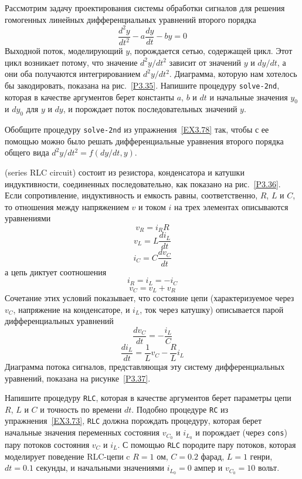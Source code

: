 \begin{exercise}{3.78}\label{EX3.78}%
Рассмотрим задачу проектирования системы обработки
сигналов для решения гомогенных линейных дифференциальных уравнений
второго порядка
$$
\frac{d^2 y}{dt^2} - a \frac{dy}{dt} - by = 0
$$
Выходной поток, моделирующий $y$, порождается сетью,
содержащей цикл.  Этот цикл возникает потому, что
значение ${d^2 y}/{dt^2}$ зависит от значений
$y$ и $dy/dt$, а они оба получаются
интегрированием ${d^2 y}/{dt^2}$.  Диаграмма, которую
нам хотелось бы закодировать, показана на
рис.~\ref{P3.35}.  Напишите процедуру
{\tt solve-2nd}, которая в качестве аргументов берет константы
$a$, $b$ и $dt$ и начальные значения
$y_0$ и $dy_0$ для $y$ и
$dy$, и порождает поток последовательных значений
$y$.
\end{exercise}
\begin{exercise}{3.79}\label{EX3.79}%
Обобщите процедуру {\tt solve-2nd} из
упражнения~\ref{EX3.78} так, чтобы с ее помощью можно было решать
дифференциальные уравнения второго порядка общего вида
${d^2 y}/{dt^2} = f (dy/dt, y)$.
\end{exercise}
\begin{exercise}{3.80}\label{EX3.80}%
 (series RLC circuit)
состоит из резистора, конденсатора и катушки
индуктивности, соединенных последовательно, как показано на
рис.~\ref{P3.36}. Если сопротивление, индуктивность и
емкость равны, соответственно, $R$, $L$ и
$C$, то отношения между напряжением $v$ и током
$i$ на трех элементах описываются уравнениями
$$
v_R = i_R R
$$
$$
v_L = L \frac{di_L}{dt}
$$
$$
i_C = C \frac{dv_C}{dt}
$$
а  цепь диктует соотношения
$$
i_R = i_L = -i_C
$$
$$
v_C = v_L + v_R
$$
Сочетание этих условий показывает, что состояние цепи
(характеризуемое через $v_C$, напряжение на конденсаторе, и
$i_L$, ток через катушку) описывается парой
дифференциальных уравнений
$$
\frac{dv_C}{dt} = -\frac{i_L}{C}
$$
$$
\frac{di_L}{dt} = \frac{1}{L} v_C - \frac{R}{L} i_L
$$
Диаграмма потока сигналов, представляющая эту систему дифференциальных
ура\-внений, показана на рисунке~\ref{P3.37}.

Напишите процедуру {\tt RLC}, которая в качестве
аргументов берет параметры цепи $R$, $L$ и
$C$ и точность по времени $dt$.  Подобно
процедуре {\tt RC} из упражнения~\ref{EX3.73},
{\tt RLC} должна порождать процедуру, которая берет начальные
значения переменных состояния $v_{C_0}$ и
$i_{L_0}$ и порождает (через {\tt cons}) пару
потоков состояния $v_C$ и $i_L$.  С помощью
{\tt RLC} породите пару потоков, которая моделирует поведение
RLC-цепи c $R = 1$ ом, $C = 0.2$ фарад, $L
= 1$ генри, $dt = 0.1$ секунды, и начальными
значениями $i_{L_0} = 0$ ампер и $v_{C_0} = 10$
вольт.
\end{exercise}

